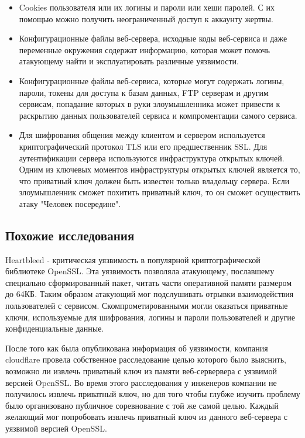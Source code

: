 \documentclass[20pt]{article}
\begin{document}
\begin{itemize}

  \item Cookies пользователя или их логины и пароли или хеши паролей. С их
  помощью можно получить неограниченный доступ к аккаунту жертвы.

  \item Конфигурационные файлы веб-сервера, исходные коды веб-сервиса и даже переменные
  окружения содержат информацию, которая может помочь атакующему найти и
  эксплуатировать различные уязвимости.

  \item Конфигурационные файлы веб-сервиса, которые могут содержать логины,
  пароли, токены для доступа к базам данных, FTP серверам и другим сервисам,
  попадание которых в руки злоумышленника может привести к раскрытию данных
  пользователей сервиса и компроментации самого сервиса.

  \item Для шифрования общения между клиентом и сервером используется криптографический
  протокол TLS\cite{tls} или его предшественник SSL. Для аутентификации сервера
  используются инфраструктура открытых ключей\cite{pki}. Одним из ключевых моментов
  инфраструктуры открытых ключей является то, что приватный ключ должен быть
  известен только владельцу сервера. Если злоумышленник сможет похитить приватный
  ключ, то он сможет осуществить атаку "Человек посередине"\cite{mitm}.

\end{itemize}


\subsection{Похожие исследования}

Heartbleed\cite{heartbleed} - критическая уязвимость в популярной криптографической
библиотеке OpenSSL. Эта уязвимость позволяла атакующему, пославшему специально
сформированный пакет, читать части оперативной памяти размером до 64КБ. Таким
образом атакующий мог подслушивать отрывки взаимодействия пользователей с сервисом.
Скомпрометированными могли оказаться приватные ключи, используемые для шифрования,
логины и пароли пользователей и другие конфиденциальные данные.

После того как была опубликована информация об уязвимости, компания cloudflare
провела собственное расследование\cite{heartbleed/investigation} целью которого
было выяснить, возможно ли извлечь приватный ключ из памяти веб-сервервера с
уязвимой версией OpenSSL. Во время этого расследования у инженеров компании не
получилось извлечь приватный ключ, но для того чтобы глубже изучить проблему
было организовано публичное соревнование\cite{hearbleed/investigation} с той же
самой целью. Каждый желающий мог попробовать извлечь приватный ключ из
данного веб-сервера с уязвимой версией OpenSSL.
\end{document}
